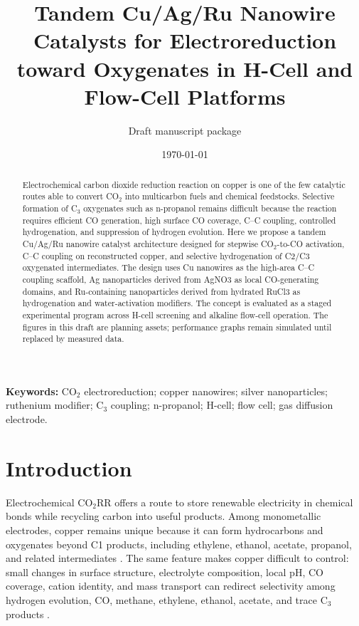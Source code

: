 \documentclass[11pt]{article}
\title{Tandem Cu/Ag/Ru Nanowire Catalysts for \coTwo{} Electroreduction toward \cThree{} Oxygenates in H-Cell and Flow-Cell Platforms}
\author{Draft manuscript package}
\date{\today}
\newcommand{\coTwo}{CO$_2$}
\newcommand{\coTwoRR}{CO$_2$RR}
\newcommand{\cThree}{C$_3$}
\begin{document}
\maketitle

\begin{abstract}
Electrochemical carbon dioxide reduction reaction on copper is one of the few catalytic routes able to convert \coTwo{} into multicarbon fuels and chemical feedstocks. Selective formation of \cThree{} oxygenates such as n-propanol remains difficult because the reaction requires efficient CO generation, high surface CO coverage, C--C coupling, controlled hydrogenation, and suppression of hydrogen evolution. Here we propose a tandem Cu/Ag/Ru nanowire catalyst architecture designed for stepwise \coTwo{}-to-CO activation, C--C coupling on reconstructed copper, and selective hydrogenation of C2/C3 oxygenated intermediates. The design uses Cu nanowires as the high-area C--C coupling scaffold, Ag nanoparticles derived from AgNO3 as local CO-generating domains, and Ru-containing nanoparticles derived from hydrated RuCl3 as hydrogenation and water-activation modifiers. The concept is evaluated as a staged experimental program across H-cell screening and alkaline flow-cell operation. The figures in this draft are planning assets; performance graphs remain simulated until replaced by measured data.
\end{abstract}

\textbf{Keywords:} \coTwo{} electroreduction; copper nanowires; silver nanoparticles; ruthenium modifier; \cThree{} coupling; n-propanol; H-cell; flow cell; gas diffusion electrode.

\section{Introduction}

Electrochemical \coTwoRR{} offers a route to store renewable electricity in chemical bonds while recycling carbon into useful products. Among monometallic electrodes, copper remains unique because it can form hydrocarbons and oxygenates beyond C1 products, including ethylene, ethanol, acetate, propanol, and related intermediates \cite{Hori2008,Kuhl2012,Nitopi2019}. The same feature makes copper difficult to control: small changes in surface structure, electrolyte composition, local pH, CO coverage, cation identity, and mass transport can redirect selectivity among hydrogen evolution, CO, methane, ethylene, ethanol, acetate, and trace \cThree{} products \cite{Resasco2017,Ringe2019,Bui2022}.
\end{document}
